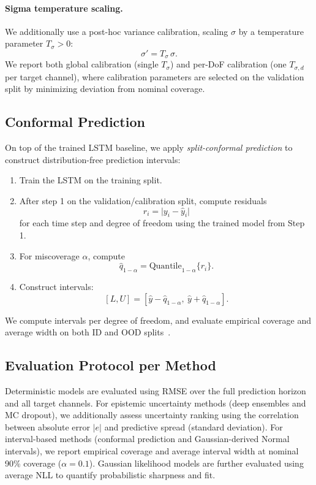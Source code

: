 \documentclass[a4paper,fleqn]{cas-sc}
\begin{document}
\paragraph{Sigma temperature scaling.}
We additionally use a post-hoc variance calibration, scaling \(\sigma\) by a temperature parameter \(T_{\sigma}>0\):
\[
\sigma' = T_{\sigma}\,\sigma.
\]
We report both global calibration (single \(T_{\sigma}\)) and per-DoF calibration (one \(T_{\sigma,d}\) per target channel), where calibration parameters are selected on the validation split by minimizing deviation from nominal coverage.

\subsection{Conformal Prediction}

On top of the trained LSTM baseline, we apply \emph{split-conformal prediction} to construct distribution-free prediction intervals:
\begin{enumerate}
    \item Train the LSTM on the training split.
    \item After step 1 on the validation/calibration split, compute residuals
    \[
    r_i = \bigl|y_i - \hat{y}_i\bigr|
    \]
    for each time step and degree of freedom using the trained model from Step 1.
    \item For miscoverage \(\alpha\), compute
    \[
    \hat{q}_{1-\alpha} = \mathrm{Quantile}_{1-\alpha}\{r_i\}.
    \]
    \item Construct intervals:
    \[
    [L, U] = [\hat{y} - \hat{q}_{1-\alpha},\ \hat{y} + \hat{q}_{1-\alpha}].
    \]
\end{enumerate}

We compute intervals per degree of freedom, and evaluate empirical coverage and average width on both ID and OOD splits~\cite{stankeviciute2021conformal}.


\subsection{Evaluation Protocol per Method}
Deterministic models are evaluated using RMSE over the full prediction horizon and all target channels. For epistemic uncertainty methods (deep ensembles and MC dropout), we additionally assess uncertainty ranking using the correlation between absolute error \(|e|\) and predictive spread (standard deviation). For interval-based methods (conformal prediction and Gaussian-derived Normal intervals), we report empirical coverage and average interval width at nominal 90\% coverage (\(\alpha=0.1\)). Gaussian likelihood models are further evaluated using average NLL to quantify probabilistic sharpness and fit.
\end{document}
